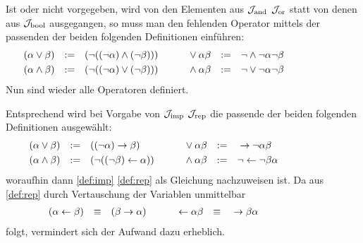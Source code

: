 Ist \symqt{$\lor$} oder \symqt{$\land$} nicht vorgegeben, \textdh wird von den Elementen aus $\mathcal{J}_{\mathrm{and}}$ \textbzw $\mathcal{J}_{\mathrm{or}}$ statt von denen aus $\mathcal{J}_{\mathrm{bool}}$ ausgegangen, so muss man den fehlenden Operator mittels der passenden der beiden folgenden Definitionen einführen:
\begin{align}
	& (\alpha \lor \beta) & := & & & (\lnot((\lnot\alpha)\land(\lnot\beta)))
	& &&&&
	&  \lor \alpha \beta  & := & & &  \lnot \land \lnot \alpha \lnot \beta
	\label{def:orand}
	\\
	& (\alpha \land \beta) & := & & & (\lnot((\lnot\alpha)\lor(\lnot\beta)))
	& &&&&
	& \land \alpha \beta   & := & & &  \lnot \lor \lnot \alpha \lnot \beta
	\label{def:andor}
	&&&&&&&&&&
\end{align}
Nun sind wieder alle Operatoren definiert.

Entsprechend wird bei Vorgabe von $\mathcal{J}_{\mathrm{imp}}$ \textbzw $\mathcal{J}_{\mathrm{rep}}$ die passende der beiden folgenden Definitionen ausgewählt:
\begin{align}
	& (\alpha \lor  \beta) & := & & & ((\lnot \alpha) \rightarrow \beta)
	& &&&&
	&  \lor  \alpha \beta  & := & & &   \rightarrow \lnot \alpha \beta
	\label{def:orrep}
	\\
	& (\alpha \land \beta) & := & & & (\lnot ((\lnot \beta) \leftarrow \alpha))
	& &&&&
	&  \land \alpha \beta  & := & & &  \lnot \leftarrow \lnot \beta \alpha
	\label{def:andrep}
	&&&&&&&&&&
\end{align}
woraufhin dann \eqref{def:imp} \textbzw \eqref{def:rep} als Gleichung nachzuweisen ist.
Da aus \eqref{def:rep} durch Vertauschung der Variablen unmittelbar
\begin{align}
	& (\alpha \leftarrow \beta) & \equiv & & & (\beta \rightarrow \alpha)
	& &&&&
	&  \leftarrow \alpha \beta  & \equiv & & &  \rightarrow \beta \alpha
	\label{eq:repimp}
	&&&&&&&&&&
\end{align}
folgt, vermindert sich der Aufwand dazu erheblich.

